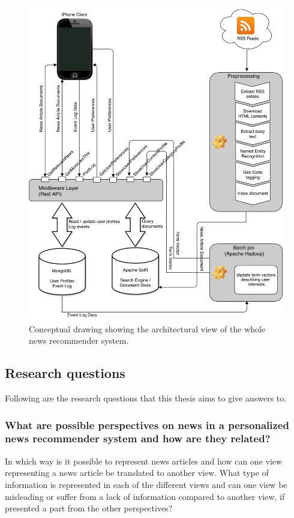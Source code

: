 \begin{figure}[!htbp]
\centering
\includegraphics[width=130mm]{GFX/tech/newsAppArchitecture.png}
\caption{Conceptual drawing showing the architectural view of the whole news recommender system.}
\label{tech_news_app_architectural_view}
\end{figure}

\subsection{Research questions}
Following are the research questions that this thesis aims to give answers to.

\subsubsection{What are possible perspectives on news in a personalized news recommender system and how are they related?}

In which way is it possible to represent news articles and how can one view representing a news article be translated to another view. What type of information is represented in each of the different views and can one view be misleading or suffer from a lack of information compared to another view, if presented a part from the other perspectives?

